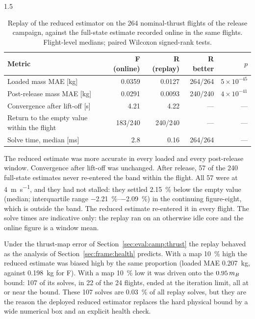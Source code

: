 \begin{spacing}{1.5}
\begin{table}[ht]
\centering
\caption{Replay of the reduced estimator on the 264 nominal-thrust flights of the
release campaign, against the full-state estimate recorded online in the same
flights. Flight-level medians; paired Wilcoxon signed-rank tests.}
\label{tab:reducedreplay}
\small
\begin{tabular}{@{}lrrrr@{}}
\toprule
Metric & F (online) & R (replay) & R better & $p$ \\
\midrule
Loaded mass MAE [\si{\kg}] & 0.0359 & 0.0127 & 264/264 & $5\times10^{-45}$ \\
Post-release mass MAE [\si{\kg}] & 0.0291 & 0.0093 & 240/240 & $4\times10^{-41}$ \\
Convergence after lift-off [\si{\second}] & 4.21 & 4.22 & --- & --- \\
Return to the empty value within the flight & 183/240 & 240/240 & --- & --- \\
Solve time, median [\si{\milli\second}] & 2.8 & 0.16 & 264/264 & --- \\
\bottomrule
\end{tabular}
\end{table}

The reduced estimate was more accurate in every loaded and every post-release
window. Convergence after lift-off was unchanged. After release, 57 of the 240
full-state estimates never re-entered the band within the flight. All 57 were at
\SI{4}{\meter\per\second}, and they had not stalled: they settled
\SI{2.15}{\percent} below the empty value (median; interquartile range
\SIrange{-2.21}{-2.09}{\percent}) in the continuing figure-eight, which is outside
the band. The reduced estimate re-entered it in every flight. The solve times are indicative only: the replay ran on an otherwise
idle core and the online figure is a window mean.

Under the thrust-map error of Section~\ref{sec:eval:camp:thrust} the replay
behaved as the analysis of Section~\ref{sec:frame:health} predicts. With a map
\SI{10}{\percent} high the reduced estimate was biased high by the same
proportion (loaded MAE \SI{0.207}{\kg}, against \SI{0.198}{\kg} for F). With a
map \SI{10}{\percent} low it was driven onto the $0.95\,m_B$ bound: 107 of its
solves, in 22 of the 24 flights, ended at the iteration limit, all at or near
the bound. These 107 solves are \SI{0.03}{\percent} of all replay solves, but
they are the reason the deployed reduced estimator replaces the hard physical
bound by a wide numerical box and an explicit health check.


\end{spacing}
